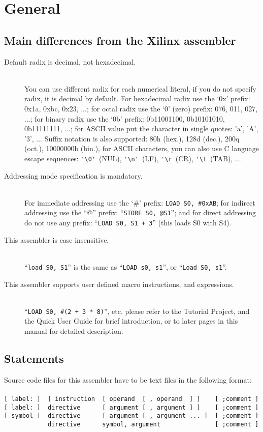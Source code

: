 \clearpage
\section{General}
    \subsection{Main differences from the Xilinx assembler}
        \begin{description}
            \item[Default radix is decimal, not hexadecimal.]~\\
                You can use different radix for each numerical literal, if you do not specify radix, it is decimal by default. For hexadecimal radix use the `0x' prefix: 0x1a, 0xbc, 0x23, ...; for octal radix use the `0' (zero) prefix: 076, 011, 027, ...; for binary radix use the `0b' prefix: 0b11001100, 0b10101010, 0b11111111, ...; for ASCII value put the character in single quotes: 'a', 'A', '3', ... Suffix notation is also supported: 80h (hex.), 128d (dec.), 200q (oct.), 10000000b (bin.), for ASCII characters, you can also use C language escape sequences: \verb"'\0'"~(NUL), \verb"'\n'"~(LF), \verb"'\r"~(CR), \verb"'\t"~(TAB), ...
            \item[Addressing mode specification is mandatory.]~\\
                For immediate addressing use the `\#' prefix: \texttt{LOAD~S0,~\#0xAB}; for indirect addressing use the ``@'' prefix: ``\texttt{STORE~S0,~@S1}''; and for direct addressing do not use any prefix: ``\texttt{LOAD~S0,~S1~+~3}'' (this loads S0 with S4).
            \item[This assembler is case insensitive.]~\\
                ``\texttt{load~S0,~S1}'' is the same as ``\texttt{LOAD~s0,~s1}'', or ``\texttt{Load~S0,~s1}''.
            \item[This assembler supports user defined macro instructions, and expressions.]~\\
                ``\texttt{LOAD~S0,~\#(2~+~3~*~8)}'', etc. please refer to the Tutorial Project, and the Quick User Guide for brief introduction, or to later pages in this manual for detailed description.
        \end{description}

    \clearpage
    \subsection{Statements}
        Source code files for this assembler have to be text files in the following format:
        ~\\\\
        \verb'[ label: ]  [ instruction  [ operand  [ , operand  ] ]    [ ;comment ]'\\
        \verb'[ label: ]  directive      [ argument [ , argument ] ]    [ ;comment ]'\\
        \verb'[ symbol ]  directive      [ argument [ , argument ... ]  [ ;comment ]'\\
        \verb'            directive      symbol, argument               [ ;comment ]'\\

